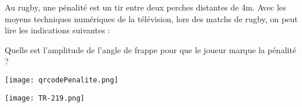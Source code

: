 
\begin{minipage}{0.48\linewidth}


Au rugby, une pénalité est un tir entre deux perches distantes de 4m. Avec les moyens techniques numériques de la télévision, lors des matchs de rugby, on peut lire les indications suivantes :


Quelle  est l'amplitude de l'angle de frappe pour que le joueur marque la pénalité ?

\texttt{[image: qrcodePenalite.png]} 

\end{minipage}
\hfill
\begin{minipage}{0.48\linewidth}
\texttt{[image: TR-219.png]} 
\end{minipage}